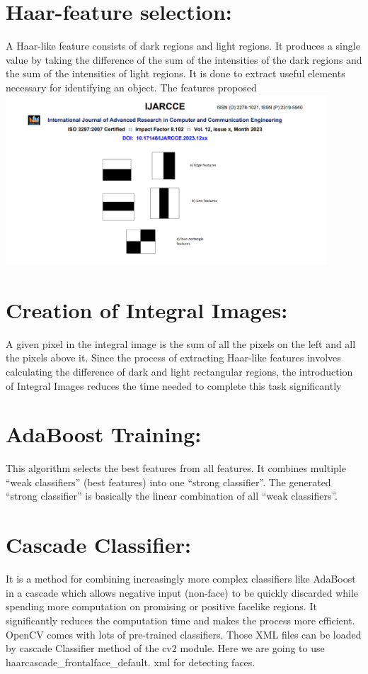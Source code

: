 \section{Haar-feature selection:}A Haar-like feature consists of dark regions and light regions. It produces a single value by taking the difference of
the sum of the intensities of the dark regions and the sum of the intensities of light regions. It is done to extract
useful elements necessary for identifying an object. The features proposed 
\includegraphics [width=0.9\textwidth]{report.png}


\section{Creation of Integral Images:}
A given pixel in the integral image is the sum of all the pixels on the left and all the pixels above it. Since the
process of extracting Haar-like features involves calculating the difference of dark and light rectangular regions, the
introduction of Integral Images reduces the time needed to complete this task significantly

\section{AdaBoost Training:}This algorithm selects the best features from all features. It combines multiple “weak classifiers” (best features) into
one “strong classifier”. The generated “strong classifier” is basically the linear combination of all “weak classifiers”.



\section{Cascade Classifier:}
It is a method for combining increasingly more complex classifiers like AdaBoost in a cascade which allows
negative input (non-face) to be quickly discarded while spending more computation on promising or positive facelike regions. It significantly reduces the computation time and makes the process more efficient.
OpenCV comes with lots of pre-trained classifiers. Those XML files can be loaded by cascade Classifier method of
the cv2 module. Here we are going to use haarcascade_frontalface_default. xml for detecting faces.


